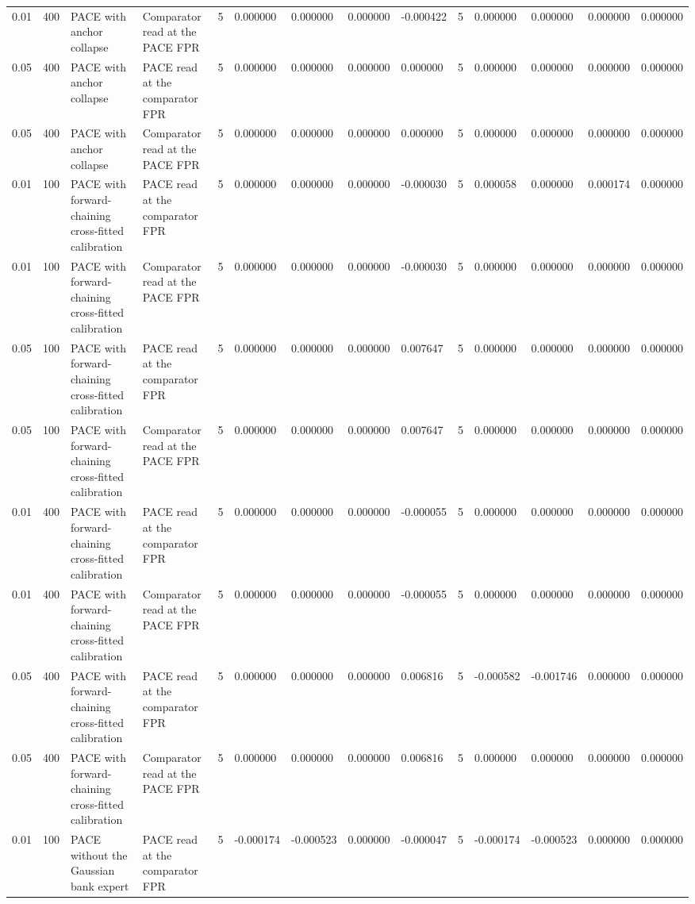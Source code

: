 \begin{tabular}{llllllllllllll}
0.01 & 400 & PACE with anchor collapse & Comparator read at the PACE FPR & 5 & 0.000000 & 0.000000 & 0.000000 & -0.000422 & 5 & 0.000000 & 0.000000 & 0.000000 & 0.000000 \\
0.05 & 400 & PACE with anchor collapse & PACE read at the comparator FPR & 5 & 0.000000 & 0.000000 & 0.000000 & 0.000000 & 5 & 0.000000 & 0.000000 & 0.000000 & 0.000000 \\
0.05 & 400 & PACE with anchor collapse & Comparator read at the PACE FPR & 5 & 0.000000 & 0.000000 & 0.000000 & 0.000000 & 5 & 0.000000 & 0.000000 & 0.000000 & 0.000000 \\
0.01 & 100 & PACE with forward-chaining cross-fitted calibration & PACE read at the comparator FPR & 5 & 0.000000 & 0.000000 & 0.000000 & -0.000030 & 5 & 0.000058 & 0.000000 & 0.000174 & 0.000000 \\
0.01 & 100 & PACE with forward-chaining cross-fitted calibration & Comparator read at the PACE FPR & 5 & 0.000000 & 0.000000 & 0.000000 & -0.000030 & 5 & 0.000000 & 0.000000 & 0.000000 & 0.000000 \\
0.05 & 100 & PACE with forward-chaining cross-fitted calibration & PACE read at the comparator FPR & 5 & 0.000000 & 0.000000 & 0.000000 & 0.007647 & 5 & 0.000000 & 0.000000 & 0.000000 & 0.000000 \\
0.05 & 100 & PACE with forward-chaining cross-fitted calibration & Comparator read at the PACE FPR & 5 & 0.000000 & 0.000000 & 0.000000 & 0.007647 & 5 & 0.000000 & 0.000000 & 0.000000 & 0.000000 \\
0.01 & 400 & PACE with forward-chaining cross-fitted calibration & PACE read at the comparator FPR & 5 & 0.000000 & 0.000000 & 0.000000 & -0.000055 & 5 & 0.000000 & 0.000000 & 0.000000 & 0.000000 \\
0.01 & 400 & PACE with forward-chaining cross-fitted calibration & Comparator read at the PACE FPR & 5 & 0.000000 & 0.000000 & 0.000000 & -0.000055 & 5 & 0.000000 & 0.000000 & 0.000000 & 0.000000 \\
0.05 & 400 & PACE with forward-chaining cross-fitted calibration & PACE read at the comparator FPR & 5 & 0.000000 & 0.000000 & 0.000000 & 0.006816 & 5 & -0.000582 & -0.001746 & 0.000000 & 0.000000 \\
0.05 & 400 & PACE with forward-chaining cross-fitted calibration & Comparator read at the PACE FPR & 5 & 0.000000 & 0.000000 & 0.000000 & 0.006816 & 5 & 0.000000 & 0.000000 & 0.000000 & 0.000000 \\
0.01 & 100 & PACE without the Gaussian bank expert & PACE read at the comparator FPR & 5 & -0.000174 & -0.000523 & 0.000000 & -0.000047 & 5 & -0.000174 & -0.000523 & 0.000000 & 0.000000 \\

\end{tabular}
